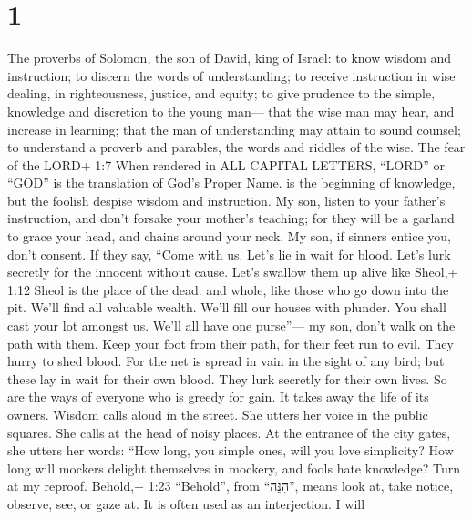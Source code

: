 \hypertarget{section}{%
\section{1}\label{section}}

 The proverbs of Solomon, the son of David, king of Israel:
 to know wisdom and instruction; to discern the words of
understanding;  to receive instruction in wise dealing, in
righteousness, justice, and equity;  to give prudence to the
simple, knowledge and discretion to the young man---  that
the wise man may hear, and increase in learning; that the man of
understanding may attain to sound counsel;  to understand a
proverb and parables, the words and riddles of the wise. 
The fear of the LORD+ 1:7 When rendered in ALL CAPITAL LETTERS, ``LORD''
or ``GOD'' is the translation of God's Proper Name. is the beginning of
knowledge, but the foolish despise wisdom and instruction. 
My son, listen to your father's instruction, and don't forsake your
mother's teaching;  for they will be a garland to grace your
head, and chains around your neck.  My son, if sinners
entice you, don't consent.  If they say, ``Come with us.
Let's lie in wait for blood. Let's lurk secretly for the innocent
without cause.  Let's swallow them up alive like Sheol,+
1:12 Sheol is the place of the dead. and whole, like those who go down
into the pit.  We'll find all valuable wealth. We'll fill
our houses with plunder.  You shall cast your lot amongst
us. We'll all have one purse''---  my son, don't walk on
the path with them. Keep your foot from their path,  for
their feet run to evil. They hurry to shed blood.  For the
net is spread in vain in the sight of any bird;  but these
lay in wait for their own blood. They lurk secretly for their own lives.
 So are the ways of everyone who is greedy for gain. It
takes away the life of its owners.  Wisdom calls aloud in
the street. She utters her voice in the public squares. 
She calls at the head of noisy places. At the entrance of the city
gates, she utters her words:  ``How long, you simple ones,
will you love simplicity? How long will mockers delight themselves in
mockery, and fools hate knowledge?  Turn at my reproof.
Behold,+ 1:23 ``Behold'', from ``הִנֵּה'', means look at, take notice,
observe, see, or gaze at. It is often used as an interjection. I will
